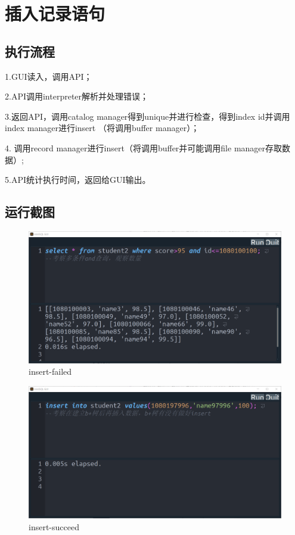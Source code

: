 \documentclass[UTF8]{ctexrep} %
\begin{document}
\section{插入记录语句}
\subsection{执行流程}
1.GUI读入，调用API；
\par
2.API调用interpreter解析并处理错误；
\par
3.返回API，调用catalog manager得到unique并进行检查，得到index id并调用index manager进行insert （将调用buffer manager）；
\par
4. 调用record manager进行insert（将调用buffer并可能调用file manager存取数据）;
\par
5.API统计执行时间，返回给GUI输出。
\subsection{运行截图}
\begin{figure}[H]
    \centering
    \includegraphics[width=0.8\linewidth]{figure/6.1.png}
    \caption{insert-failed}
    \label{fig:runtime6.1}
\end{figure}
\begin{figure}[H]
    \centering
    \includegraphics[width=0.8\linewidth]{figure/6.2.png}
    \caption{insert-succeed}
    \label{fig:runtime6.2}
\end{figure}
\end{document}
